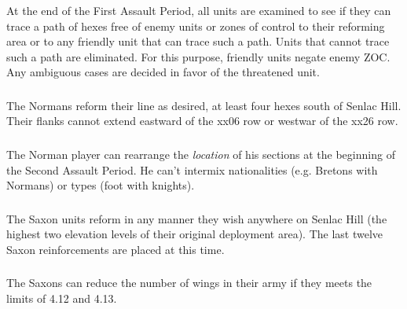 \subsubsection[Reforming Area]{} At the end of the First Assault Period, all units are examined to see if they can trace a path of hexes free of enemy units or zones of control to their reforming area or to any friendly unit that can trace such a path. Units that cannot trace such a path are eliminated. For this purpose, friendly units negate enemy ZOC. Any ambiguous cases are decided in favor of the threatened unit.

\subsubsection[Norman Reform]{} The Normans reform their line as desired, at least four hexes south of Senlac Hill. Their flanks cannot extend eastward of the xx06 row or westwar of the xx26 row.

\subsubsection[Norman Rearrangement]{} The Norman player can rearrange the \textit{location} of his sections at the beginning of the Second Assault Period. He can't intermix nationalities (e.g. Bretons with Normans) or types (foot with knights).

\subsubsection[Saxon Reform]{} The Saxon units reform in any manner they wish anywhere on Senlac Hill (the highest two elevation levels of their original deployment area). The last twelve Saxon reinforcements are placed at this time.

\subsubsection[Saxon Reduction]{} The Saxons can reduce the number of wings in their army if they meets the limits of 4.12 and 4.13.
